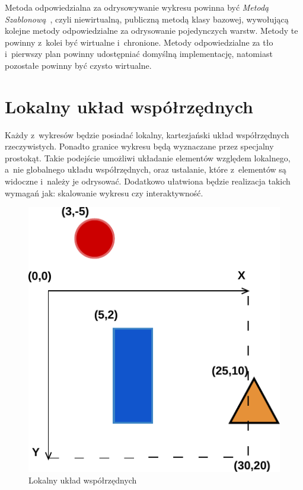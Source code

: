 Metoda odpowiedzialna za odrysowywanie wykresu powinna być \textit{Metodą Szablonową}~\cite{Patterns}, czyli niewirtualną, publiczną metodą klasy bazowej, wywołującą kolejne metody odpowiedzialne za odrysowanie pojedynczych warstw. Metody te powinny z~kolei być wirtualne i~chronione.
Metody odpowiedzialne za tło i~pierwszy plan powinny udostępniać domyślną implementację, natomiast pozostałe powinny być czysto wirtualne.

\section{Lokalny układ współrzędnych}
Każdy z~wykresów będzie posiadać lokalny, kartezjański układ współrzędnych rzeczywistych. Ponadto granice wykresu będą wyznaczane przez specjalny prostokąt. Takie podejście umożliwi układanie elementów względem lokalnego, a~nie globalnego układu współrzędnych, oraz ustalanie, które z~elementów są widoczne i~należy je odrysować. Dodatkowo ułatwiona będzie realizacja takich wymagań jak: skalowanie wykresu czy interaktywność. 

\begin{figure}[H]
\centering
\includegraphics{img/uklad_wspolrzednych.pdf}
\caption{Lokalny układ współrzędnych}\label{rys:uklad:wspolrzednych}
\end{figure}

